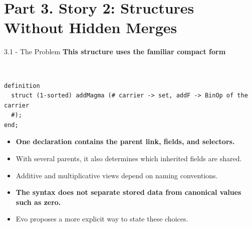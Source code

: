 \documentclass[aspectratio=169,11pt]{beamer}
\newcommand{\statusbadge}[2]{\colorbox{#1}{\textcolor{white}{\strut\scriptsize\sffamily\bfseries #2}}}
\newcommand{\badgeMML}{\statusbadge{blue!45!black}{exact MML excerpt}}
\begin{document}
\section{Part 3. Story 2: Structures Without Hidden Merges}
\begin{frame}[fragile,t]{3.1 - The Problem}
\smallskip
\textbf{This structure uses the familiar compact form}~\badgeMML
\begin{lstlisting}[language={mizar},basicstyle=\ttfamily\footnotesize]
definition
  struct (1-sorted) addMagma (# carrier -> set, addF -> BinOp of the carrier
  #);
end;
\end{lstlisting}
\begin{itemize}
\setlength{\itemsep}{1pt}
\setlength{\parsep}{0pt}
\setlength{\parskip}{0pt}
\item \textcolor{blue!55!black}{\textbf{One declaration contains the parent link, fields, and selectors.}}
\item With several parents, it also determines which inherited fields are shared.
\item Additive and multiplicative views depend on naming conventions.
\item \textcolor{blue!55!black}{\textbf{The syntax does not separate stored data from canonical values such as zero.}}
\item Evo proposes a more explicit way to state these choices.
\end{itemize}
\end{frame}
\end{document}
